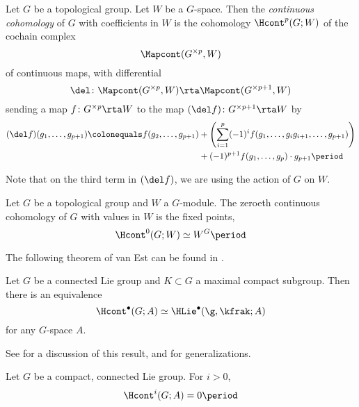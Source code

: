 \begin{defn}  
	Let $G$ be a topological group. 
	Let $W$ be a $G$-space. 
	Then the \emph{continuous cohomology} of $G$ with coefficients in $W$ is the cohomology $\Hcont^p(G;W)$ of the cochain complex
	\[\Mapcont(G^{\times p},W)\]
	of continuous maps, with differential 
	\[\del\colon \Mapcont(G^{\times p},W)\rta \Mapcont(G^{\times p+1},W)\]
	sending a map $f\colon G^{\times p}\rta W$ to the map $(\del f)\colon G^{\times p+1}\rta W$ by
	\begin{align*}
		(\del f)(g_1,\dots,g_{p+1}) \colonequals f(g_2,\dots,g_{p+1}) &+ \left(\sum_{i=1}^{p} (-1)^i f(g_1,\dots, g_ig_{i+1},\dots,g_{p+1})\right) \\ 
		&+(-1)^{p+1}f(g_1,\dots,g_p)\cdot g_{p+1} \period
	\end{align*}
\end{defn}

Note that on the third term in $(\del f)$, we are using the action of $G$ on $W$.

\begin{ex}
Let $G$ be a topological group and $W$ a $G$-module. 
The zeroeth continuous cohomology of $G$ with values in $W$ is the fixed points, 
\[\Hcont^{0}(G;W)\simeq W^G\period
\]
\end{ex}

The following theorem of van Est can be found in \cite{MR0059285}. 

\begin{thm} %
Let $G$ be a connected Lie group and $K\subset G$ a maximal compact subgroup. Then there is an equivalence
\[ \Hcont^\bullet(G;A)\simeq \HLie^\bullet(\g,\kfrak;A)\]
for any $G$-space $A$.
\end{thm} 

See \cite[\S 5]{MR494071} for a discussion of this result, and \cite{MR147577} for generalizations. 

\begin{cor}
	Let $G$ be a compact, connected Lie group. For $i>0$,
	\[
		\Hcont^i(G;A)=0 \period
	\]%
\end{cor}%


